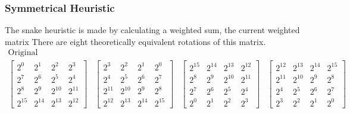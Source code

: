 \documentclass{article}
\begin{document}
\subsubsection{Symmetrical Heuristic}
The snake heuristic is made by calculating a weighted sum, the current weighted matrix There are eight theoretically equivalent rotations of this matrix.
\[
\begin{matrix}
\text{Original} \\
\begin{bmatrix}
    2^{0} & 2^{1} & 2^{2} & 2^{3} \\
    2^{7} & 2^{6} & 2^{5} & 2^{4} \\
    2^{8} & 2^{9} & 2^{10} & 2^{11} \\
    2^{15} & 2^{14} & 2^{13} & 2^{12}
\end{bmatrix}
&
\begin{bmatrix}
    2^{3} & 2^{2} & 2^{1} & 2^{0} \\
    2^{4} & 2^{5} & 2^{6} & 2^{7} \\
    2^{11} & 2^{10} & 2^{9} & 2^{8} \\
    2^{12} & 2^{13} & 2^{14} & 2^{15}
\end{bmatrix}
&
\begin{bmatrix}
    2^{15} & 2^{14} & 2^{13} & 2^{12} \\
    2^{8} & 2^{9} & 2^{10} & 2^{11} \\
    2^{7} & 2^{6} & 2^{5} & 2^{4} \\
    2^{0} & 2^{1} & 2^{2} & 2^{3}
\end{bmatrix}
&
\begin{bmatrix}
    2^{12} & 2^{13} & 2^{14} & 2^{15} \\
    2^{11} & 2^{10} & 2^{9} & 2^{8} \\
    2^{4} & 2^{5} & 2^{6} & 2^{7} \\
    2^{3} & 2^{2} & 2^{1} & 2^{0}
\end{bmatrix}
\\


\end{matrix}\]
\end{document}
